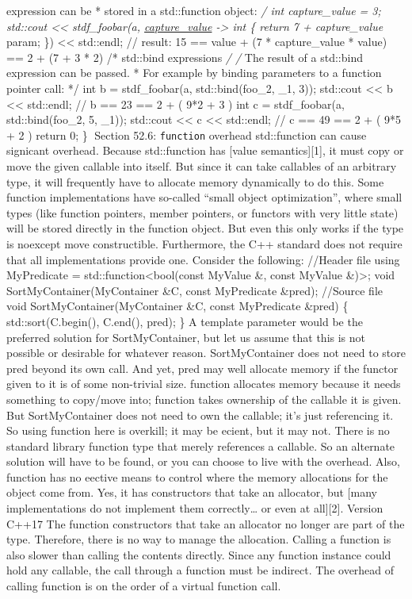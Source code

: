 expression can be * stored in a std::function object: \emph{/ int
capture\_value = 3; std::cout \textless\textless{} stdf\_foobar(a,
\href{int\%20param}{capture\_value} -\textgreater{} int \{ return 7 +
capture\_value } param; \}) \textless\textless{} std::endl; // result:
15 == value + (7 * capture\_value * value) == 2 + (7 + 3 * 2) /*
std::bind expressions \emph{/ /} The result of a std::bind expression
can be passed. * For example by binding parameters to a function pointer
call: */ int b = stdf\_foobar(a, std::bind(foo\_2, \_1, 3)); std::cout
\textless\textless{} b \textless\textless{} std::endl; // b == 23 == 2 +
( 9*2 + 3 ) int c = stdf\_foobar(a, std::bind(foo\_2, 5, \_1));
std::cout \textless\textless{} c \textless\textless{} std::endl; // c ==
49 == 2 + ( 9*5 + 2 ) return 0; \} Section 52.6:
\passthrough{\lstinline!function!} overhead std::function can cause
signicant overhead. Because std::function has {[}value
semantics{]}{[}1{]}, it must copy or move the given callable into
itself. But since it can take callables of an arbitrary type, it will
frequently have to allocate memory dynamically to do this. Some function
implementations have so-called ``small object optimization'', where
small types (like function pointers, member pointers, or functors with
very little state) will be stored directly in the function object. But
even this only works if the type is noexcept move constructible.
Furthermore, the C++ standard does not require that all implementations
provide one. Consider the following: //Header file using MyPredicate =
std::function\textless bool(const MyValue \&, const MyValue
\&)\textgreater; void SortMyContainer(MyContainer \&C, const MyPredicate
\&pred); //Source file void SortMyContainer(MyContainer \&C, const
MyPredicate \&pred) \{ std::sort(C.begin(), C.end(), pred); \} A
template parameter would be the preferred solution for SortMyContainer,
but let us assume that this is not possible or desirable for whatever
reason. SortMyContainer does not need to store pred beyond its own call.
And yet, pred may well allocate memory if the functor given to it is of
some non-trivial size. function allocates memory because it needs
something to copy/move into; function takes ownership of the callable it
is given. But SortMyContainer does not need to own the callable; it's
just referencing it. So using function here is overkill; it may be
ecient, but it may not. There is no standard library function type that
merely references a callable. So an alternate solution will have to be
found, or you can choose to live with the overhead. Also, function has
no eective means to control where the memory allocations for the object
come from. Yes, it has constructors that take an allocator, but {[}many
implementations do not implement them correctly\ldots{} or even at
all{]}{[}2{]}. Version C++17 The function constructors that take an
allocator no longer are part of the type. Therefore, there is no way to
manage the allocation. Calling a function is also slower than calling
the contents directly. Since any function instance could hold any
callable, the call through a function must be indirect. The overhead of
calling function is on the order of a virtual function call.

